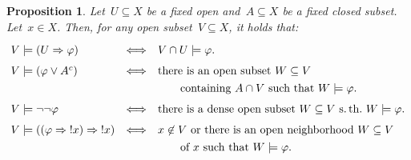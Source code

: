 \documentclass[10pt,reqno,a4paper]{amsbook}
\theoremstyle{definition}
\theoremstyle{plain}
\newtheorem{prop}[defn]{Proposition}
\theoremstyle{remark}
\newcommand{\?}{\,{:}\,}
\renewcommand{\_}{\mathpunct{.}\,}
\newcommand{\notat}[1]{{!#1}}
\begin{document}
\begin{prop}\label{prop:modops-kripke}
Let~$U \subseteq X$ be a fixed open and~$A \subseteq X$ be a fixed
closed subset. Let~$x \in X$. Then, for any open subset~$V \subseteq X$, it
holds that:
\[ \renewcommand{\arraystretch}{1.3}\begin{array}{@{}lcl@{}}
  V \models (U \Rightarrow \varphi) &\Longleftrightarrow&
    V \cap U \models \varphi. \\[0.3em]
  V \models (\varphi \vee A^c) &\Longleftrightarrow&
    \textnormal{there is an open subset~$W \subseteq V$} \\
  && \quad\quad \textnormal{containing~$A \cap V$ such that $W \models \varphi$.} \\[0.3em]
  V \models \neg\neg\varphi &\Longleftrightarrow&
    \textnormal{there is a dense open subset~$W \subseteq V$ s.\,th.\@ $W \models
    \varphi$.} \\[0.3em]
  V \models ((\varphi \Rightarrow \notat{x}) \Rightarrow \notat{x}) &\Longleftrightarrow&
    \textnormal{$x \not\in V$ or there is an open neighborhood~$W \subseteq V$} \\
  && \quad\quad \textnormal{of~$x$ such that $W \models \varphi$.}
\end{array} \]
\end{prop}
\end{document}
